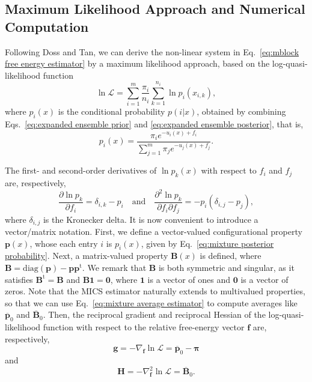 \documentclass[aip,jcp,reprint,amsmath,amssymb]{revtex4-1}
\newcommand{\mt}[1]{\boldsymbol{\mathbf{#1}}}           %
\newcommand{\vt}[1]{\boldsymbol{\mathbf{#1}}}           %
\newcommand{\tr}[1]{#1^\text{t}}                        %
\begin{document}
\subsection{Maximum Likelihood Approach and Numerical Computation}

Following Doss and Tan,\cite{Doss_2014} we can derive the non-linear system in Eq.~\eqref{eq:mblock free energy estimator} by a maximum likelihood approach, based on the log-quasi-likelihood function\cite{Doss_2014, Tan_2015, Roy_2018}
\begin{equation}
\label{eq:mblock log-quasi-likelihood}
\ln \mathcal L = \sum_{i=1}^m \frac{\pi_i}{n_i} \sum_{k=1}^{n_i} \ln p_i(x_{i,k}),
\end{equation}
where $p_i(x)$ is the conditional probability $p(i|x)$, obtained by combining Eqs.~\eqref{eq:expanded ensemble prior} and \eqref{eq:expanded ensemble posterior}, that is,
\begin{equation}
\label{eq:mixture posterior probability}
p_i(x) = \frac{\pi_i e^{-u_i(x) + f_i}}{\sum_{j=1}^m \pi_j e^{-u_j(x) + f_j}}.
\end{equation}

The first- and second-order derivatives of $\ln p_k(x)$ with respect to $f_i$ and $f_j$ are, respectively,
\begin{equation*}
\frac{\partial \ln p_k}{\partial f_i} = \delta_{i,k} - p_i \quad \text{and} \quad \frac{\partial^2\ln p_k}{\partial f_i \partial f_j} = -p_i(\delta_{i,j} - p_j),
\end{equation*}
where $\delta_{i,j}$ is the Kronecker delta. It is now convenient to introduce a vector/matrix notation. First, we define a vector-valued configurational property $\vt p(x)$, whose each entry $i$ is $p_i(x)$, given by Eq.~\eqref{eq:mixture posterior probability}. Next, a matrix-valued property $\mt B(x)$ is defined, where $\mt B = \text{diag}(\vt p) - {\vt p}\tr{\vt p}$. We remark that $\mt B$ is both symmetric and singular, as it satisfies $\tr{\mt B} = \mt B$ and $\mt B\vt 1 = \vt 0$, where $\vt 1$ is a vector of ones and $\vt 0$ is a vector of zeros. Note that the MICS estimator naturally extends to multivalued properties, so that we can use Eq.~\eqref{eq:mixture average estimator} to compute averages like $\overline{\vt p}_0$ and $\overline{\mt B}_0$. Then, the reciprocal gradient and reciprocal Hessian of the log-quasi-likelihood function with respect to the relative free-energy vector $\vt f$ are, respectively,
\begin{equation}
\label{eq:mblock score vector}
\vt g = -\nabla_{\vt f} \ln \mathcal L = \overline{\vt p}_0 - \vt \pi
\end{equation}
and
\begin{equation}
\label{eq:mblock fisher information matrix}
\mt H = -\nabla^2_{\vt f} \ln \mathcal L = \overline{\mt B}_0.
\end{equation}
\end{document}
